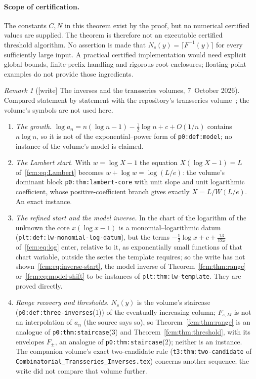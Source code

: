 \documentclass[11pt,letterpaper]{article}
\theoremstyle{remark}\newtheorem{remark}[theorem]{Remark}
\newcommand{\file}[1]{\nolinkurl{#1}}
\begin{document}
\paragraph{Scope of certification.}
The constants $C,N$ in this theorem exist by the proof, but no numerical certified values are supplied. The theorem is therefore not an executable certified threshold algorithm. No assertion is made that $N_s(y)=\lceil F^{-1}(y)\rceil$ for every sufficiently large input. A practical certified implementation would need explicit global bounds, finite-prefix handling and rigorous root enclosures; floating-point examples do not provide those ingredients.

\begin{remark}[{[write]} The inverses and the transseries volumes, 7~October 2026]\label{fcm:rem:transseries}
Compared statement by statement with the repository's transseries
volume~\cite{TSvol}; the volume's symbols are not used here.
\begin{enumerate}\raggedright
\item \emph{The growth.} $\log a_n=n(\log n-1)-\frac12\log n+c+O(1/n)$ contains
$n\log n$, so it is not of the exponential--power form of \file{p0:def:model};
no instance of the volume's model is claimed.
\item \emph{The Lambert start.} With $w=\log X-1$ the equation
$X(\log X-1)=L$ of~\eqref{fcm:eq:Lambert} becomes $w+\log w=\log(L/e)$: the
volume's dominant block \file{p0:thm:lambert-core} with unit slope and unit
logarithmic coefficient, whose positive-coefficient branch gives exactly
$X=L/W(L/e)$. An exact instance.
\item \emph{The refined start and the model inverse.} In the chart of the
logarithm of the unknown the core $x(\log x-1)$ is a monomial--logarithmic
datum (\file{plt:def:lw-monomial-log-datum}), but the terms
$-\frac12\log x+c+\frac{13}{12x}$ of~\eqref{fcm:eq:log} enter, relative to
it, as exponentially small functions of that chart variable, outside the
series the template requires; so the write has not shown~\eqref{fcm:eq:inverse-start},
the model inverse of Theorem~\ref{fcm:thm:range} or~\eqref{fcm:eq:model-shift}
to be instances of \file{plt:thm:lw-template}. They are proved directly.
\item \emph{Range recovery and thresholds.} $N_s(y)$ is the volume's
staircase (\file{p0:def:three-inverses}(1)) of the eventually increasing
column; $F_{s,M}$ is not an interpolation of $a_n$ (the source says so), so
Theorem~\ref{fcm:thm:range} is an analogue of \file{p0:thm:staircase}(3) and
Theorem~\ref{fcm:thm:threshold}, with its envelopes $F_\pm$, an analogue of
\file{p0:thm:staircase}(2); neither is an instance. The companion volume's
exact two-candidate rule (\file{t3:thm:two-candidate} of
\file{Combinatorial_Transseries_Inverses.tex}) concerns another sequence; the
write did not compare that volume further.
\end{enumerate}
\end{remark}
\end{document}
